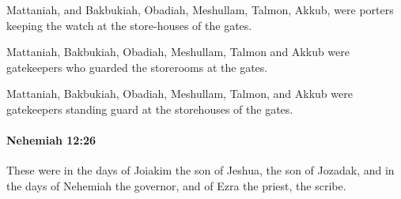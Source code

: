 			\begin{versebox}
					\item[BHS] 
					\item[LXX] 
					\item[ASV] Mattaniah, and Bakbukiah, Obadiah, Meshullam, Talmon, Akkub, were porters keeping the watch at the store-houses of the gates.
					\item[NIV] Mattaniah, Bakbukiah, Obadiah, Meshullam, Talmon and Akkub were gatekeepers who guarded the storerooms at the gates.
					\item[NRSV] Mattaniah, Bakbukiah, Obadiah, Meshullam, Talmon, and Akkub were gatekeepers standing guard at the storehouses of the gates.
			\end{versebox}

		\paragraph{Nehemiah 12:26} %
			\label{NEHEMIAH-12-26}

			These were in the days of Joiakim the son of Jeshua, the son of Jozadak, and in the days of Nehemiah the governor, and of Ezra the priest, the scribe.

